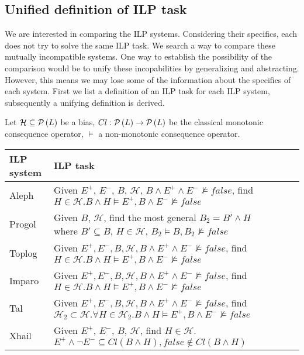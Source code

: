 \subsection{Unified definition of ILP task}
We are interested in comparing the ILP systems. Considering their specifics, each does not try to solve the same ILP task. We search a way to compare these mutually incompatible systems. One way to establish the possibility of the comparison would be to unify these incopabilities by generalizing and abstracting. However, this means we may lose some of the information about the specifics of each system. First we list a definition of an ILP task for each ILP system, subsequently a unifying definition is derived.

Let $\mathcal{H} \subseteq \mathcal{P} \left({ L }\right)$ be a bias, $Cl:\mathcal{P} \left({ L }\right) \to \mathcal{P} \left({ L }\right)$ be the classical monotonic consequence operator, $\models$ a non-monotonic consequence operator.

\begin{center}
    \begin{tabular}{ | l | p{15cm} | l | p{5cm} |}
    \hline
    ILP system & ILP task\\ \hline
    Aleph & Given $E^{+}$, $E^{-}$, $B$, $\mathcal{H}$, $B \land E^{+} \land E^{-} \not\models false$, find $H \in \mathcal{H}. B \land H \models E^{+}, B \land E^{-} \not\models false$\\ \hline
    Progol & Given $B$, $\mathcal{H}$, find the most general $B_2 = B' \land H$ where $B' \subseteq B$, $H \in \mathcal{H}$, $B_2 \models B, B_2 \not\models false$\\ \hline
    Toplog & Given $E^{+}, E^{-}, B, \mathcal{H}, B \land E^{+} \land E^{-} \not\models false$, find $H \in \mathcal{H}. B \land H \models E^{+}, B \land E^{-} \not\models false$ \\ \hline
    Imparo & Given $E^{+}, E^{-}, B, \mathcal{H}, B \land E^{+} \land E^{-} \not\models false$, find $H \in \mathcal{H}. B \land H \models E^{+}, B \land E^{-} \not\models false$ \\ \hline
    Tal & Given $E^{+}, E^{-}, B, \mathcal{H}, B \land E^{+} \land E^{-} \not\models false$, find $\mathcal{H}_2 \subset \mathcal{H}. \forall H \in \mathcal{H}_2. B \land H \models E^{+}, B \land E^{-} \not\models false$ \\ \hline
    Xhail & Given $E^{+}$, $E^{-}$, $B$, $\mathcal{H}$, find $H \in \mathcal{H}$. $E^{+} \land \neg E^{-} \subseteq Cl(B \land H), false \not\in Cl(B \land H)$\\ \hline
    \end{tabular}
\end{center}

